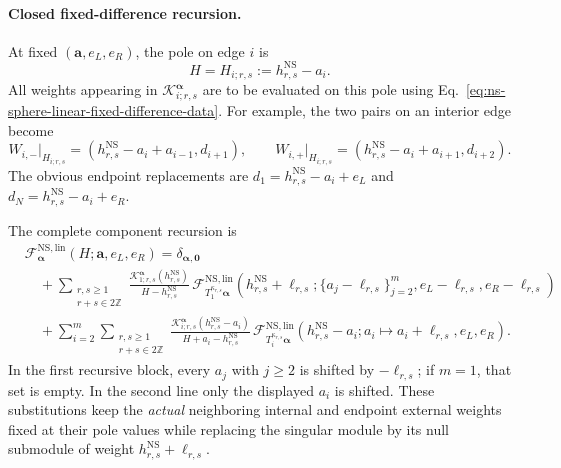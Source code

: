 \documentclass[11pt]{article}
\newcommand{\NS}{\mathrm{NS}}
\newcommand{\F}{\mathcal F}
\begin{document}
\paragraph{Closed fixed-difference recursion.}
At fixed
\((\boldsymbol a,e_L,e_R)\), the pole on edge \(i\) is
\begin{equation}
 H=H_{i;r,s}:=h^{\NS}_{r,s}-a_i.
 \label{eq:ns-sphere-linear-h-poles}
\end{equation}
All weights appearing in
\(\mathcal K_{i;r,s}^{\boldsymbol\alpha}\) are to be evaluated on this pole
using
Eq.~\eqref{eq:ns-sphere-linear-fixed-difference-data}.  For example, the
two pairs on an interior edge become
\begin{equation}
 W_{i,-}\big|_{H_{i;r,s}}
 =
 (h^{\NS}_{r,s}-a_i+a_{i-1},d_{i+1}),
 \qquad
 W_{i,+}\big|_{H_{i;r,s}}
 =
 (h^{\NS}_{r,s}-a_i+a_{i+1},d_{i+2}).
 \label{eq:ns-sphere-linear-interior-pole-pairs}
\end{equation}
The obvious endpoint replacements are
\(d_1=h^{\NS}_{r,s}-a_i+e_L\) and
\(d_N=h^{\NS}_{r,s}-a_i+e_R\).

The complete component recursion is
\begin{equation}
 \boxed{
 \begin{aligned}
 &\F^{\NS,\mathrm{lin}}_{\boldsymbol\alpha}
 (H;\boldsymbol a,e_L,e_R)
 =
 \delta_{\boldsymbol\alpha,\boldsymbol0}
 \\
 &\quad+
 \sum_{\substack{r,s\geq1\\r+s\in2\mathbb Z}}
 \frac{
 \mathcal K^{\boldsymbol\alpha}_{1;r,s}
 (h^{\NS}_{r,s})}
 {H-h^{\NS}_{r,s}}\,
 \F^{\NS,\mathrm{lin}}_{T_1^{\kappa_{r,s}}\boldsymbol\alpha}
 \left(
 h^{\NS}_{r,s}+\ell_{r,s};
 \{a_j-\ell_{r,s}\}_{j=2}^{m},
 e_L-\ell_{r,s},e_R-\ell_{r,s}
 \right)
 \\
 &\quad+
 \sum_{i=2}^{m}
 \sum_{\substack{r,s\geq1\\r+s\in2\mathbb Z}}
 \frac{
 \mathcal K^{\boldsymbol\alpha}_{i;r,s}
 (h^{\NS}_{r,s}-a_i)}
 {H+a_i-h^{\NS}_{r,s}}\,
 \F^{\NS,\mathrm{lin}}_{T_i^{\kappa_{r,s}}\boldsymbol\alpha}
 \left(
 h^{\NS}_{r,s}-a_i;
 a_i\mapsto a_i+\ell_{r,s},
 e_L,e_R
 \right).
 \end{aligned}}
 \label{eq:ns-sphere-linear-h-recursion}
\end{equation}
In the first recursive block, every \(a_j\) with \(j\geq2\) is shifted by
\(-\ell_{r,s}\); if \(m=1\), that set is empty.  In the second line only
the displayed \(a_i\) is shifted.  These substitutions keep the
\emph{actual} neighboring internal and endpoint external weights fixed at
their pole values while replacing the singular module by its null
submodule of weight \(h^{\NS}_{r,s}+\ell_{r,s}\).
\end{document}
